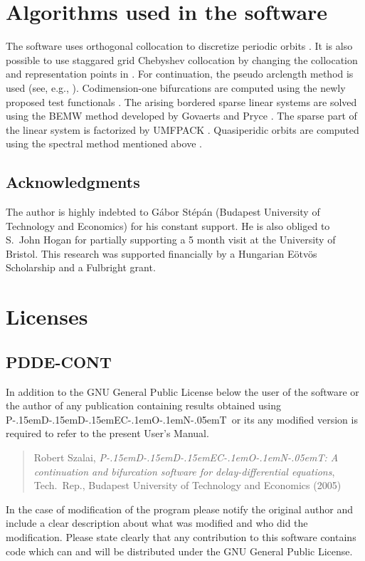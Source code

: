 \documentclass[10pt,a4paper]{ddedoc}
\def\pdde{{P\kern-.15emD\kern-.15emD\kern-.15emE\raisebox{.25ex}{-}C\kern-.1emO\kern-.1emN\kern-.05emT}}
\begin{document}
\section{Algorithms used in the software}

The software uses orthogonal collocation to discretize periodic orbits \cite{engstab,engcol}. It is also possible to use staggared grid Chebyshev collocation \cite{kopriva} by changing the collocation and representation points in . For continuation, the pseudo arclength method is used (see, e.g., \cite{handbook, tutorial1, tutorial2}). Codimension-one bifurcations are computed using the newly proposed test functionals \cite{szalai-tf}. The arising bordered sparse linear systems are solved using the BEMW method developed by Govaerts and Pryce \cite{Gov1993}. The sparse part of the linear system is factorized by UMFPACK \cite{umfpack}. Quasiperidic orbits are computed using the spectral method mentioned above \cite{kopriva}.

\subsection*{Acknowledgments}

The author is highly indebted to G\'abor St\'ep\'an (Budapest University of 
Technology and Economics) for his constant support. He is also
obliged to S.~John Hogan for partially supporting a 5 month visit at the University of Bristol.
This research was supported financially by a Hungarian E\"otv\"os Scholarship and a Fulbright grant.

\appendix

\section{Licenses}

\subsection{PDDE-CONT}

In addition to the GNU General Public License below the user of the software or the author of any
publication containing results obtained using \pdde\ or its any modified version is 
required to refer to the present User's Manual.
\begin{quote}
Robert Szalai, \emph{\pdde : A continuation and bifurcation software for 
delay-differential equations}, Tech.\ Rep., Budapest University of Technology and Economics (2005)
\end{quote}
In the case of modification of the program please notify the original author and include a clear description about what was modified and who did the 
modification. Please state clearly that any contribution to this software contains code which can and will be distributed under the GNU General Public License.
\end{document}
